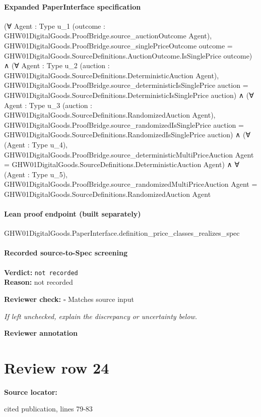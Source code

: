 \documentclass[10pt]{article}
\newcommand{\reviewerbox}{%
  \par\noindent\fbox{\parbox{0.96\linewidth}{\rule{0pt}{0.38in}}}\par
}
\newcommand{\reviewmatch}[1]{%
  \par\noindent\textbf{Reviewer check:} $\square$\; #1\par
  \noindent\emph{If left unchecked, explain the discrepancy or uncertainty below.}\par
}
\begin{document}
\paragraph{Expanded PaperInterface specification}
\begin{ReviewVerbatim}
(∀ {Agent : Type u_1} (outcome : GHW01DigitalGoods.ProofBridge.source_auctionOutcome Agent),
    GHW01DigitalGoods.ProofBridge.source_singlePriceOutcome outcome =
      GHW01DigitalGoods.SourceDefinitions.AuctionOutcome.IsSinglePrice outcome) ∧
  (∀ {Agent : Type u_2} (auction : GHW01DigitalGoods.SourceDefinitions.DeterministicAuction Agent),
      GHW01DigitalGoods.ProofBridge.source_deterministicIsSinglePrice auction =
        GHW01DigitalGoods.SourceDefinitions.DeterministicIsSinglePrice auction) ∧
    (∀ {Agent : Type u_3} (auction : GHW01DigitalGoods.SourceDefinitions.RandomizedAuction Agent),
        GHW01DigitalGoods.ProofBridge.source_randomizedIsSinglePrice auction =
          GHW01DigitalGoods.SourceDefinitions.RandomizedIsSinglePrice auction) ∧
      (∀ (Agent : Type u_4),
          GHW01DigitalGoods.ProofBridge.source_deterministicMultiPriceAuction Agent =
            GHW01DigitalGoods.SourceDefinitions.DeterministicAuction Agent) ∧
        ∀ (Agent : Type u_5),
          GHW01DigitalGoods.ProofBridge.source_randomizedMultiPriceAuction Agent =
            GHW01DigitalGoods.SourceDefinitions.RandomizedAuction Agent
\end{ReviewVerbatim}

\paragraph{Lean proof endpoint (built separately)}\begin{ReviewVerbatim}
GHW01DigitalGoods.PaperInterface.definition_price_classes_realizes_spec
\end{ReviewVerbatim}

\paragraph{Recorded source-to-Spec screening}
\textbf{Verdict:} \texttt{not recorded}
\\
\textbf{Reason:} not recorded
\reviewmatch{Matches source input}
\noindent\textbf{Reviewer annotation}\par
\reviewerbox
\clearpage
\hypertarget{source-claim-f5aa4c6369b51530}{}
\section*{Review row 24}
\textbf{Source locator:} {\footnotesize\raggedright cited publication, lines 79-\allowbreak{}83\par}
\end{document}
